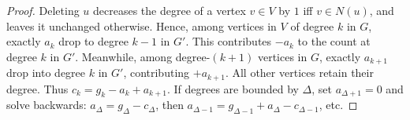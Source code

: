 \documentclass[10pt,a4paper]{amsart}
\begin{document}
\begin{proof}
Deleting $u$ decreases the degree of a vertex $v\in V$ by $1$ iff $v\in N(u)$, and leaves it unchanged otherwise.
Hence, among vertices in $V$ of degree $k$ in $G$, exactly $a_k$ drop to degree $k-1$ in $G'$. This contributes $-a_k$ to the count at degree $k$ in $G'$.
Meanwhile, among degree-$(k+1)$ vertices in $G$, exactly $a_{k+1}$ drop into degree $k$ in $G'$, contributing $+a_{k+1}$.
All other vertices retain their degree. Thus $c_k = g_k - a_k + a_{k+1}$.
If degrees are bounded by $\Delta$, set $a_{\Delta+1}=0$ and solve backwards:
$a_\Delta = g_\Delta - c_\Delta$, then $a_{\Delta-1}= g_{\Delta-1}+a_\Delta - c_{\Delta-1}$, etc.
\end{proof}
\end{document}
